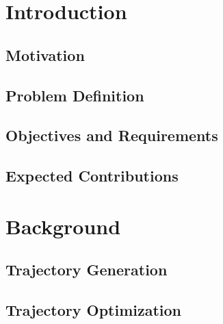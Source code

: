 \documentclass[a4paper, oneside]{article}
\begin{document}
\makecover

\tableofcontents
\clearpage

\clearpage
\section{Introduction}
    \subsection{Motivation}
    \label{sec:Introduction:Motivation}
    

    \subsection{Problem Definition}
    \label{sec:Introduction:Problem Definition}
    

    \subsection{Objectives and Requirements}
    \label{sec:Introduction:Objectives and Requirments}
    

    \subsection{Expected Contributions}
    \label{sec:Introduction:Contributions}
    

\clearpage
\section{Background}
    \subsection{Trajectory Generation}
    \label{sec:Background:Trajectory Generation}
    

    \subsection{Trajectory Optimization}
    \label{sec:Background:Trajectory Optimization}
    
\end{document}
